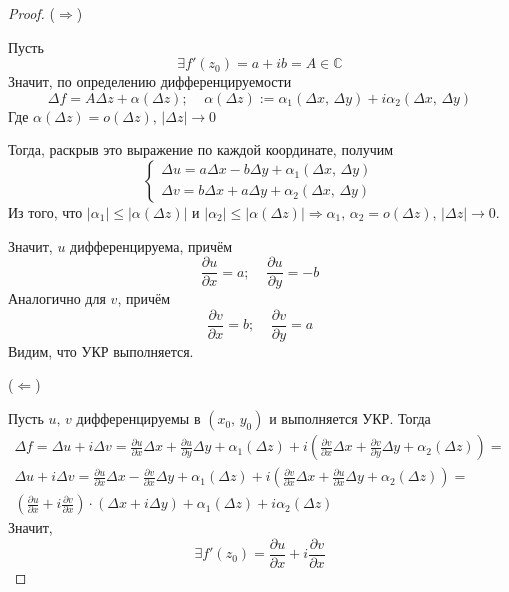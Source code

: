 \documentclass[a4paper,12pt]{article}
\renewcommand{\leq}{\ensuremath{\leqslant}}
\theoremstyle{plain}
\theoremstyle{definition}
\theoremstyle{remark}
\begin{document}
\begin{proof}
	($\Rightarrow$)

	Пусть
	\[
		\exists f'(z_0) = a + ib = A \in \mathbb{C}
	\]
	Значит, по определению дифференцируемости
	\[
		\Delta f = A\Delta z + \alpha(\Delta z);\;\;\;\; \alpha(\Delta z) := \alpha_1(\Delta x,\, \Delta y) + i\alpha_2(\Delta x,\, \Delta y)
	\]
	Где $\alpha(\Delta z) = o(\Delta z),\, \vert\Delta z\vert \to 0$

	Тогда, раскрыв это выражение по каждой координате, получим
	\[
		\begin{cases}
			\Delta u = a\Delta x - b\Delta y + \alpha_1(\Delta x,\, \Delta y) \\
			\Delta v = b\Delta x + a \Delta y + \alpha_2(\Delta x,\, \Delta y)
		\end{cases}
	\]
	Из того, что $\vert\alpha_1\vert \leq \vert \alpha(\Delta z)\vert$ и $\vert\alpha_2\vert \leq \vert \alpha(\Delta z)\vert \Rightarrow \alpha_1,\, \alpha_2 = o(\Delta z),\, \vert \Delta z\vert \to 0$.

	Значит, $u$ дифференцируема, причём
	\[
		\frac{\partial u}{\partial x} = a ;\;\;\;\; \frac{\partial u}{\partial y} = -b
	\]
	Аналогично для $v$, причём
	\[
		\frac{\partial v}{\partial x} = b ;\;\;\;\; \frac{\partial v}{\partial y} = a
	\]
	Видим, что УКР выполняется.

	($\Leftarrow$)

	Пусть $u,\, v$ дифференцируемы в $(x_0,\, y_0)$ и выполняется УКР. Тогда
	\begin{align*}
		\Delta f = \Delta u + i\Delta v = \frac{\partial u}{\partial x}\Delta x + \frac{\partial u}{\partial y}\Delta y + \alpha_1(\Delta z) + i\left(\frac{\partial v}{\partial x}\Delta x + \frac{\partial v}{\partial y}\Delta y + \alpha_2(\Delta z)\right) = \\
		\Delta u + i\Delta v = \frac{\partial u}{\partial x}\Delta x - \frac{\partial v}{\partial x}\Delta y + \alpha_1(\Delta z) + i\left(\frac{\partial v}{\partial x}\Delta x + \frac{\partial u}{\partial x}\Delta y + \alpha_2(\Delta z)\right) =            \\
		\left(\frac{\partial u}{\partial x} + i\frac{\partial v}{\partial x}\right)\cdot(\Delta x + i\Delta y) + \alpha_1(\Delta z) + i\alpha_2(\Delta z)
	\end{align*}
	Значит,
	\[
		\exists f'(z_0) = \frac{\partial u}{\partial x} +i\frac{\partial v}{\partial x}
	\]
\end{proof}
\end{document}
